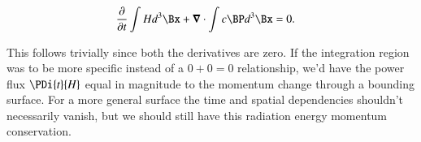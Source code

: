 \begin{align}\label{eqn:ftMaxVacuum:82}
\PD{t}{} \int H d^3 \Bx + \spacegrad \cdot \int c \BP d^3 \Bx &= 0.
\end{align}

This follows trivially since both the derivatives are zero.  If the integration region was to be more specific instead of a $0 + 0 = 0$ relationship, we'd have the power flux $\PDi{t}{H}$ equal in magnitude to the momentum change through a bounding surface.  For a more general surface the time and spatial dependencies shouldn't necessarily vanish, but we should still have this radiation energy momentum conservation.


\EndArticle
